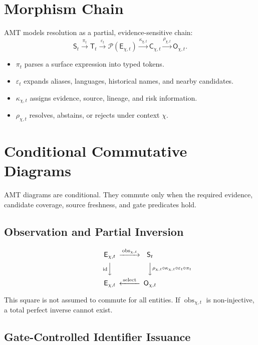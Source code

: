 \documentclass[11pt]{article}
\newcommand{\Surf}{\mathsf{S}}
\newcommand{\Tok}{\mathsf{T}}
\newcommand{\Ent}{\mathsf{E}}
\newcommand{\Cand}{\mathsf{C}}
\newcommand{\Out}{\mathsf{O}}
\newcommand{\Pow}{\mathcal{P}}
\begin{document}
\section{Morphism Chain}

AMT models resolution as a partial, evidence-sensitive chain:
\[
\Surf_t
  \xrightarrow{\pi_t}
\Tok_t
  \xrightarrow{\varepsilon_t}
\Pow(\Ent_{\chi,t})
  \xrightarrow{\kappa_{\chi,t}}
\Cand_{\chi,t}
  \xrightarrow{\rho_{\chi,t}}
\Out_{\chi,t}.
\]

\begin{itemize}[leftmargin=1.5em]
\item \(\pi_t\) parses a surface expression into typed tokens.
\item \(\varepsilon_t\) expands aliases, languages, historical names, and
nearby candidates.
\item \(\kappa_{\chi,t}\) assigns evidence, source, lineage, and risk
information.
\item \(\rho_{\chi,t}\) resolves, abstains, or rejects under context \(\chi\).
\end{itemize}

\section{Conditional Commutative Diagrams}

AMT diagrams are conditional. They commute only when the required evidence,
candidate coverage, source freshness, and gate predicates hold.

\subsection{Observation and Partial Inversion}

\[
\begin{CD}
\Ent_{\chi,t} @>{\operatorname{obs}_{\chi,t}}>> \Surf_t \\
@V{\operatorname{id}}VV @VV{\rho_{\chi,t}\circ\kappa_{\chi,t}\circ\varepsilon_t\circ\pi_t}V \\
\Ent_{\chi,t} @<{\operatorname{select}}<< \Out_{\chi,t}
\end{CD}
\]

This square is not assumed to commute for all entities. If
\(\operatorname{obs}_{\chi,t}\) is non-injective, a total perfect inverse cannot
exist.

\subsection{Gate-Controlled Identifier Issuance}
\end{document}
